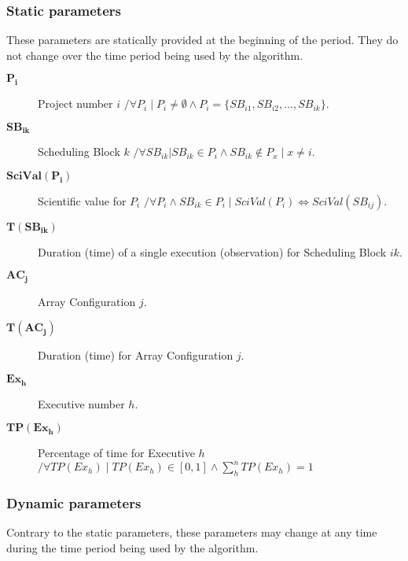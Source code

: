 \subsubsection{Static parameters}
These parameters are statically provided at the beginning of the period. They do not change over the time period being used by the algorithm.

\begin{description}
\item[$\mathbf{P_i}$] Project number $i$ $\slash \forall P_i \mid P_i \neq \emptyset \land P_i = \{SB_{i1}, SB_{i2}, \ldots, SB_{ik}\}$.

\item[$\mathbf{SB_{ik}}$] Scheduling Block $k$ $\slash \forall SB_{ik} | SB_{ik} \in P_i \land SB_{ik} \notin P_x \mid x \neq i$.

\item[$\mathbf{SciVal(P_i)}$] Scientific value for $P_i$ $\slash \forall P_i \land SB_{ik} \in P_i \mid SciVal(P_i) \Leftrightarrow SciVal(SB_{ij}) $.

\item[$\mathbf{T(SB_{ik})}$] Duration (time) of a single execution (observation) for Scheduling Block $ik$.

\item[$\mathbf{AC_j}$] Array Configuration $j$.

\item[$\mathbf{T(AC_j)}$] Duration (time) for Array Configuration $j$.

\item[$\mathbf{Ex_h}$] Executive number $h$.

\item[$\mathbf{TP(Ex_h)}$] Percentage of time for Executive $h$ $\slash \forall TP(Ex_h) \mid TP(Ex_h) \in {[0,1]} \land \sum_{h}^{n} TP(Ex_h) = 1$ 

\end{description} 

\subsubsection{Dynamic parameters}
Contrary to the static parameters, these parameters may change at any time during the time period being used by the algorithm.

